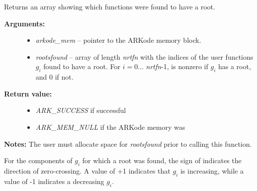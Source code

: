 \documentclass[letterpaper,10pt,english]{sphinxmanual}
\begin{document}

\begin{fulllineitems}
\label{c_interface/User_callable:ARKodeGetRootInfo}
Returns an array showing which functions were found to
have a root.
\begin{description}
\item[{\textbf{Arguments:}}] \leavevmode\begin{itemize}
\item {} 
\emph{arkode\_mem} -- pointer to the ARKode memory block.

\item {} 
\emph{rootsfound} -- array of length \emph{nrtfn} with the indices of the
user functions $g_i$ found to have a root.  For
$i = 0 \ldots$ \emph{nrtfn}-1,  is nonzero
if $g_i$ has a root, and 0 if not.

\end{itemize}

\item[{\textbf{Return value:}}] \leavevmode\begin{itemize}
\item {} 
\emph{ARK\_SUCCESS} if successful

\item {} 
\emph{ARK\_MEM\_NULL} if the ARKode memory was 

\end{itemize}

\end{description}

\textbf{Notes:} The user must allocate space for \emph{rootsfound} prior to
calling this function.

For the components of $g_i$ for which a root was found, the
sign of  indicates the direction of
zero-crossing.  A value of +1 indicates that $g_i$ is
increasing, while a value of -1 indicates a decreasing $g_i$.

\end{fulllineitems}

\end{document}
